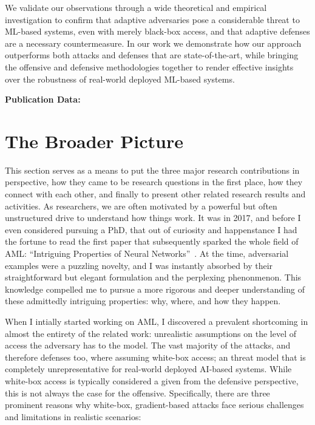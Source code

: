 We validate our observations through a wide theoretical and empirical investigation to confirm that adaptive adversaries pose a considerable threat to ML-based systems, even with merely black-box access, and that adaptive defenses are a necessary countermeasure.
In our work we demonstrate how our approach outperforms both attacks and defenses that are state-of-the-art, while bringing the offensive and defensive methodologies together to render effective insights over the robustness of real-world deployed ML-based systems.

\textbf{Publication Data:} 

\section{The Broader Picture}

This section serves as a means to put the three major research contributions in perspective, how they came to be research questions in the first place, how they connect with each other, and finally to present other related research results and activities.
As researchers, we are often motivated by a powerful but often unstructured drive to understand how things work.
It was in 2017, and before I even considered pursuing a PhD, that out of curiosity and happenstance I had the fortune to read the first paper that subsequently sparked the whole field of \gls{AML}: ``Intriguing Properties of Neural Networks''~\cite{szegedy2013intriguing}.
At the time, adversarial examples were a puzzling novelty, and I was instantly absorbed by their straightforward but elegant formulation and the perplexing phenonmenon.
This knowledge compelled me to pursue a more rigorous and deeper understanding of these admittedly intriguing properties: why, where, and how they happen.

When I intially started working on \gls{AML}, I discovered a prevalent shortcoming in almost the entirety of the related work: unrealistic assumptions on the level of access the adversary has to the model.
The vast majority of the attacks, and therefore defenses too, where assuming white-box access; an threat model that is completely unrepresentative for real-world deployed AI-based systems.
While white-box access is typically considered a given from the defensive perspective, this is not always the case for the offensive. Specifically, there are three prominent reasons why white-box, gradient-based attacks face serious challenges and limitations in realistic scenarios:

